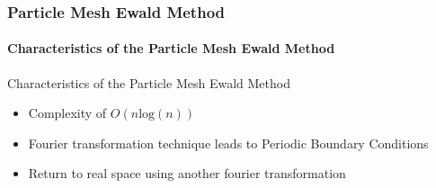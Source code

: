\documentclass[10pt]{beamer}
\newcommand{\bcen}{\begin{center}}
\newcommand{\ecen}{\end{center}}
\begin{document}
\begin{frame}
\frametitle{Particle Mesh Ewald Method}
\framesubtitle{Characteristics of the Particle Mesh Ewald Method}
\bcen Characteristics of the Particle Mesh Ewald Method \ecen
\begin{itemize}
\item<1-> Complexity of $O(n\text{log}(n))$
\item<2-> Fourier transformation technique leads to Periodic Boundary Conditions
\item<3-> Return to real space using another fourier transformation
\end{itemize}
\end{frame}
\end{document}
